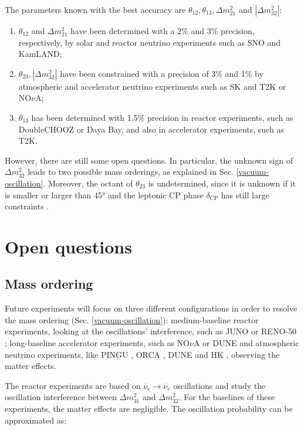 The parameters known with the best accuracy are $\theta_{12}, \theta_{13}, \Delta m^2_{21}$ and $|\Delta m^2_{32}|$:
\begin{enumerate}
    \item $\theta_{12}$ and $\Delta m^2_{21}$ have been determined with a 2\% and 3\% precision, respectively, by solar and reactor neutrino experiments such as SNO and KamLAND;
    \item $\theta_{23}, |\Delta m^2_{32}|$ have been constrained with a precision of 3\% and 1\% by atmospheric and accelerator neutrino experiments such as SK and T2K or NO$\nu$A;
    \item $\theta_{13}$ has been determined with 1.5\% precision in reactor experiments, such as DoubleCHOOZ or Daya Bay, and also in accelerator experiments, such as T2K. 
\end{enumerate}

However, there are still some open questions. In particular, the unknown sign of $\Delta m^2_{32}$ leads to two possible mass orderings, as explained in Sec. \ref{vacuum-oscillation}. Moreover, the octant of $\theta_{23}$ is undetermined, since it is unknown if it is smaller or larger than 45° and the leptonic CP phase $\delta_{\text{CP}}$ has still large constraints \cite{pdg:2022ynf}.

\section{Open questions}
\subsection{Mass ordering}
Future experiments will focus on three different configurations in order to resolve the mass ordering (Sec. \ref{vacuum-oscillation}): medium-baseline reactor experiments, looking at the oscillations' interference, such as JUNO \cite{JUNO-MO} or RENO-50 \cite{RENO}; long-baseline accelerator experiments, such as NO$\nu$A or DUNE and atmospheric neutrino experiments, like PINGU \cite{PINGU}, ORCA \cite{ORCA}, DUNE \cite{dunecollaboration2022snowmass} and HK \cite{hyperkamio}, observing the matter effects.

The reactor experiments are based on $\overline{\nu}_e \rightarrow \overline{\nu}_e$ oscillations and study the oscillation interference between $\Delta m^2_{31}$ and $\Delta m^2_{32}$. For the baselines of these experiments, the matter effects are negligible.
The oscillation probability can be approximated as:

